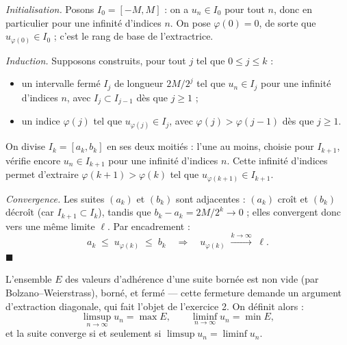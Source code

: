 
\begin{mdframed}[style=proofbar]
  \textit{Initialisation.} Posons $I_0 = [-M,M]$ : on a $u_n \in I_0$ pour
  tout $n$, donc en particulier pour une infinité d'indices $n$. On pose
  $\varphi(0) = 0$, de sorte que $u_{\varphi(0)} \in I_0$ ; c'est le rang de
  base de l'extractrice.

  \medskip
  \textit{Induction.} Supposons construits, pour tout $j$ tel que
  $0 \leq j \leq k$ :
  \begin{itemize}
    \item un intervalle fermé $I_j$ de longueur $2M/2^j$ tel que
          $u_n \in I_j$ pour une infinité d'indices $n$, avec
          $I_j \subset I_{j-1}$ dès que $j \geq 1$ ;
    \item un indice $\varphi(j)$ tel que $u_{\varphi(j)} \in I_j$, avec
          $\varphi(j) > \varphi(j-1)$ dès que $j \geq 1$.
  \end{itemize}
  On divise $I_k = [a_k, b_k]$ en ses deux moitiés : l'une au moins,
  choisie pour $I_{k+1}$, vérifie encore $u_n \in I_{k+1}$ pour une
  infinité d'indices $n$. Cette infinité d'indices permet d'extraire
  $\varphi(k+1) > \varphi(k)$ tel que $u_{\varphi(k+1)} \in I_{k+1}$.

  \medskip
  \textit{Convergence.} Les suites $(a_k)$ et $(b_k)$ sont adjacentes :
  $(a_k)$ croît et $(b_k)$ décroît (car $I_{k+1} \subset I_k$), tandis que
  $b_k - a_k = 2M/2^k \to 0$ ; elles convergent donc vers une même limite
  $\ell$.
  Par encadrement :
  \[
    a_k \;\leq\; u_{\varphi(k)} \;\leq\; b_k
    \quad\Longrightarrow\quad
    u_{\varphi(k)} \;\xrightarrow{k \to \infty}\; \ell.
  \]
  \hfill$\blacksquare$
\end{mdframed}


L'ensemble $E$ des valeurs d'adhérence d'une suite bornée est non vide
(par Bolzano--Weierstrass), borné, et fermé — cette fermeture demande un
argument d'extraction diagonale, qui fait l'objet de l'exercice 2. On
définit alors :
\[
  \limsup_{n\to\infty} u_n = \max E, \qquad
  \liminf_{n\to\infty} u_n = \min E,
\]
et la suite converge si et seulement si $\limsup u_n = \liminf u_n$.

\decsep{}


